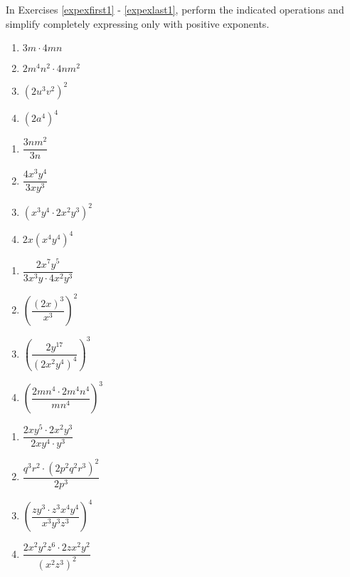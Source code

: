 In Exercises \ref{expexfirst1} - \ref{expexlast1}, perform the indicated operations and simplify completely expressing only with positive exponents.

\begin{multicols}{4}
\begin{enumerate}
\setcounter{enumi}{\value{HW}}

\item $3 m \cdot 4 mn$ \label{expexfirst1} 
\item $2 m^4 n^2 \cdot 4 n m^2$
\item $(2 u^3 v^2)^2$
\item $(2 a^4)^4$

\setcounter{HW}{\value{enumi}}
\end{enumerate}
\end{multicols}

\begin{multicols}{4}
\begin{enumerate}
\setcounter{enumi}{\value{HW}}

\item $\dfrac{3 n m^2}{3 n}$
\item $\dfrac{4 x^3 y^4}{3 x y^3}$
\item $(x^3 y^4 \cdot 2 x^2 y^3)^2 $
\item $2 x (x^4 y^4)^4$

\setcounter{HW}{\value{enumi}}
\end{enumerate}
\end{multicols}

\begin{multicols}{4}
\begin{enumerate}
\setcounter{enumi}{\value{HW}}

\item $\dfrac{2 x^7 y^5}{3 x^3 y \cdot 4 x^2 y^3}$
\item $\left( \dfrac{(2 x)^3}{x^3} \right)^2$
\item $\left( \dfrac{2 y^{17}}{(2 x^2 y^4)^4} \right)^3$
\item $\left( \dfrac{2 m n^4 \cdot 2 m^4 n^4}{m n^4} \right)^3$

\setcounter{HW}{\value{enumi}}
\end{enumerate}
\end{multicols}

\begin{multicols}{4}
\begin{enumerate}
\setcounter{enumi}{\value{HW}}

\item $\dfrac{2 x y^5 \cdot 2 x^2 y^3}{2 x y^4 \cdot y^3}$
\item $\dfrac{q^3 r^2 \cdot (2 p^2 q^2 r^3)^2}{2 p^3}$
\item $\left( \dfrac{z y^3 \cdot z^3 x^4 y^4}{x^3 y^3 z^3} \right)^4$
\item $\dfrac{2 x^2 y^2 z^6 \cdot 2 z x^2 y^2}{(x^2 z^3)^2}$ \label{expexlast1}

\setcounter{HW}{\value{enumi}}
\end{enumerate}
\end{multicols}


